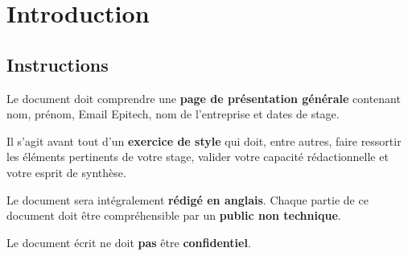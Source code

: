 \chapter{Introduction}

\section{Instructions}
\color{red}
Le document doit comprendre une \textbf{page de présentation générale} contenant nom, prénom, Email Epitech, nom de l’entreprise et dates de stage.

Il s’agit avant tout d’un \textbf{exercice de style} qui doit, entre autres, faire ressortir les éléments
pertinents de votre stage, valider votre capacité rédactionnelle et votre esprit de synthèse.

Le document sera intégralement \textbf{rédigé en anglais}. Chaque partie de ce document doit être
compréhensible par un \textbf{public non technique}.

Le document écrit ne doit \textbf{pas} être \textbf{confidentiel}.
\color{black}

\clearpage
